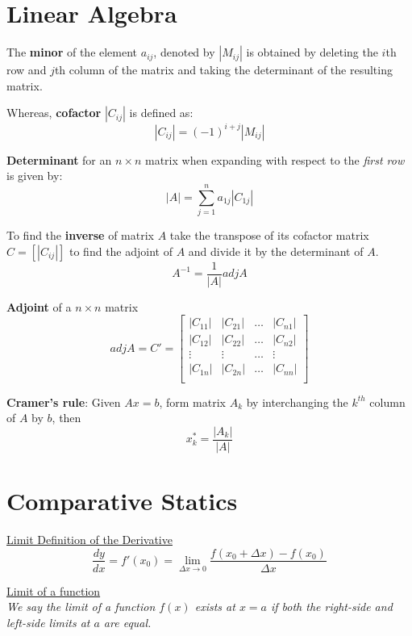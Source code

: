 \documentclass{./../../Latex/tests}
\begin{document}
\thispagestyle{plain}

\vspace{-1cm}
\section*{Linear Algebra} 
The \textbf{minor} of the element $a_{ij}$, denoted by $|M_{ij}|$ is obtained by deleting the $i$th row and $j$th column of the matrix and taking the determinant of the resulting matrix. 

Whereas, \textbf{cofactor} $|C_{ij}|$ is defined as:
$$ |C_{ij}| = (-1)^{i+j} |M_{ij}| $$ 

\textbf{Determinant} for an  $n \times n$ matrix when expanding with respect to the \textit{first row} is given by:
 $$|A| = \sum_{j=1}^n a_{1j} |C_{1j}| $$ 

To find the \textbf{inverse} of matrix $A$ take the transpose of its cofactor matrix $C = [|C_{ij}|]$ to find the adjoint of $A$ and divide it by the determinant of $A$. 
$$ A^{-1} = \frac{1}{|A|} adj A$$ 

\textbf{Adjoint} of a  $n \times n$ matrix \\
 $$adj A = C' = \left[\begin{array}{llll}
|C_{11}| & |C_{21}| & \hdots & |C_{n1}| \\
|C_{12}| & |C_{22}| & \hdots &  |C_{n2}| \\
\vdots &\vdots & \hdots &  \vdots \\
|C_{1n}| & |C_{2n}| & \hdots & |C_{nn}| \\
\end{array}\right]$$ 

\textbf{Cramer's rule}: Given $Ax =b$, form matrix $A_k$ by interchanging the $k^{th}$ column of $A$ by $b$, then  $$x^*_k = \frac{|A_k|}{|A|}$$


\newpage
\section*{Comparative Statics}

\underline{Limit Definition of the Derivative}
\[ \frac{d y}{d x} = f'(x_0) = \lim_{\Delta x \rightarrow 0} \frac{f\left(x_{0}+\Delta x\right)-f\left(x_{0}\right)}{\Delta x}\]

\underline{Limit of a function} \\
\textit{We say the limit of a function $f(x)$ exists at $x=a$ if both the right-side and left-side limits at $a$ are equal.} 
\vspace{0.5em}
\end{document}
